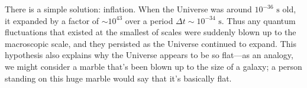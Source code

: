\documentclass[../a062main.tex]{subfiles}
\begin{document}
There is a simple solution: inflation.
When the Universe was around $10^{-36} \textrm{ s}$ old, it expanded by a factor of $\sim 10^{43}$ over a period $\Delta t \sim 10^{-34} \textrm{ s}$.
Thus any quantum fluctuations that existed at the smallest of scales were suddenly blown up to the macroscopic scale, and they persisted as the Universe continued to expand.
This hypothesis also explains why the Universe appears to be so flat---as an analogy, we might consider a marble that's been blown up to the size of a galaxy; a person standing on this huge marble would say that it's basically flat.
\end{document}
